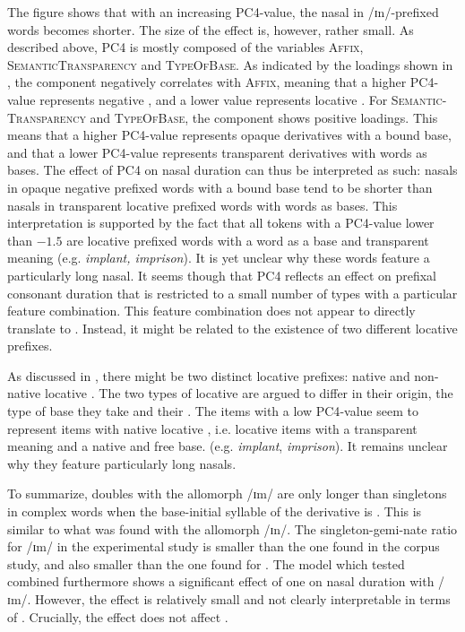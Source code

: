 The figure shows that with an increasing \textsc{PC4}-value, the nasal in /ɪn/-prefixed words becomes shorter. The size of the effect is, however, rather small. 
As described above, \textsc{PC4} is mostly composed of the variables \textsc{Affix}, \textsc{SemanticTransparency} and \textsc{TypeOfBase}. As indicated by the loadings shown in , the component negatively correlates with \textsc{Affix}, meaning that a higher \textsc{PC4}-value represents negative , and a lower value represents locative . For \textsc{Semantic- Transparency} and \textsc{TypeOfBase}, the component shows positive loadings. This means that a higher \textsc{PC4}-value represents opaque derivatives with a bound base, and that a lower \textsc{PC4}-value represents transparent derivatives with words as bases.
The effect of \textsc{PC4} on nasal duration can thus be interpreted as such: nasals in opaque negative prefixed words with a bound base tend to be shorter than nasals in transparent locative prefixed words with words as bases. This interpretation is supported by the fact that all tokens with a \textsc{PC4}-value lower than $-1.5$ are locative prefixed words with a word as a base and transparent meaning (e.g. \textit{implant, imprison}). It is yet unclear why these words feature a particularly long nasal. 
It seems though that \textsc{PC4} reflects an effect on prefixal consonant duration that is restricted to a small number of types with a particular feature combination. This feature combination does not appear to directly translate to .  
Instead, it might be related to the existence of two different locative prefixes. 

As discussed in , there might be two distinct locative prefixes: native and non-native locative . The two types of locative  are argued to differ in their origin, the type of base they take and their . The items with a low \textsc{PC4}-value seem to represent items with native locative , i.e. locative items with a transparent meaning and a native and free base. (e.g. \textit{implant}, \textit{imprison}). It remains unclear why they feature particularly long nasals.



To summarize,  doubles with the allomorph /ɪm/ are only longer than singletons in complex words when the base-initial syllable of the derivative is . This is similar to what was found with the allomorph /ɪn/. The singleton-gemi-nate ratio for /ɪm/ in the experimental study is smaller than the one found in the corpus study, and also smaller than the one found for . 
The model which tested combined  furthermore shows a significant effect of one  on nasal duration with /ɪm/. However, the effect is relatively small and not clearly interpretable in terms of . Crucially, the effect does not affect .




